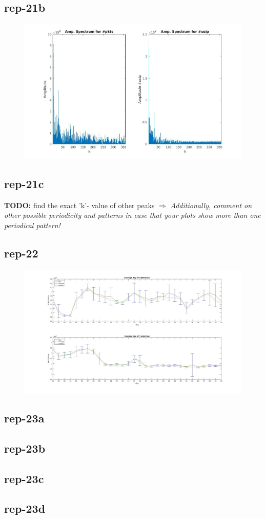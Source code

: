 \subsection*{rep-21b}
\begin{figure}[H]
\center
\includegraphics[width=.7\textwidth]{./chapters/plots/rep21b.jpg}\\
\caption{}
\end{figure}

\subsection*{rep-21c}
\textbf{TODO:} find the exact 'k'- value of other peaks $\Rightarrow$ \textit{Additionally, comment on other possible periodicity and patterns in case that your plots show more than one periodical pattern!}
\subsection*{rep-22}
\begin{figure}[H]
\center
\includegraphics[width=1\textwidth]{./chapters/plots/rep-22.jpg}\\
\caption{}
\end{figure}

\subsection*{rep-23a}

\subsection*{rep-23b}

\subsection*{rep-23c}

\subsection*{rep-23d}

